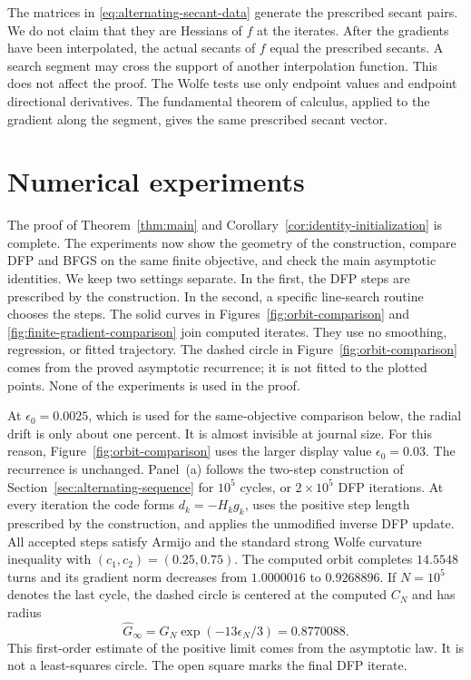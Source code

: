 \documentclass[11pt]{article}
\begin{document}
The matrices in \eqref{eq:alternating-secant-data} generate the prescribed
secant pairs.  We do not claim that they are Hessians of $f$ at the iterates.
After the gradients have been interpolated, the actual secants of $f$ equal
the prescribed secants.  A search segment may cross the support of another
interpolation function.  This does not affect the proof.  The Wolfe tests use
only endpoint values and endpoint directional derivatives.  The fundamental
theorem of calculus, applied to the gradient along the segment, gives the same
prescribed secant vector.

\section{Numerical experiments}
\label{sec:numerics}

The proof of Theorem~\ref{thm:main} and
Corollary~\ref{cor:identity-initialization} is complete.  The experiments now
show the geometry of the construction, compare DFP and BFGS on the same finite
objective, and check the main asymptotic identities.  We keep two settings
separate.  In the first, the DFP steps are prescribed by the construction.  In
the second, a specific line-search routine chooses the steps.  The solid curves
in Figures~\ref{fig:orbit-comparison} and
\ref{fig:finite-gradient-comparison} join computed iterates.  They use no
smoothing, regression, or fitted trajectory.  The dashed circle in
Figure~\ref{fig:orbit-comparison} comes from the proved asymptotic recurrence;
it is not fitted to the plotted points.  None of the experiments is used in
the proof.

At $\epsilon_0=0.0025$, which is used for the same-objective comparison below,
the radial drift is only about one percent.  It is almost invisible at journal
size.  For this reason, Figure~\ref{fig:orbit-comparison} uses the larger
display value $\epsilon_0=0.03$.  The recurrence is unchanged.  Panel~(a) follows the
two-step construction of
Section~\ref{sec:alternating-sequence} for $10^5$ cycles, or $2\times10^5$
DFP iterations.  At every iteration the code forms $d_k=-H_kg_k$, uses the
positive step length prescribed by the construction, and applies the
unmodified inverse DFP update.  All accepted steps satisfy Armijo and the
standard strong Wolfe curvature inequality with
$(c_1,c_2)=(0.25,0.75)$.  The computed orbit completes $14.5548$ turns and its
gradient norm decreases from $1.0000016$ to $0.9268896$.  If $N=10^5$ denotes
the last cycle, the dashed circle is centered at the computed $C_N$ and has
radius
\[
  \widehat G_\infty=G_N\exp(-13\epsilon_N/3)=0.8770088.
\]
This first-order estimate of the positive limit comes from the asymptotic law.
It is not a least-squares circle.  The open square marks the final DFP iterate.
\end{document}

